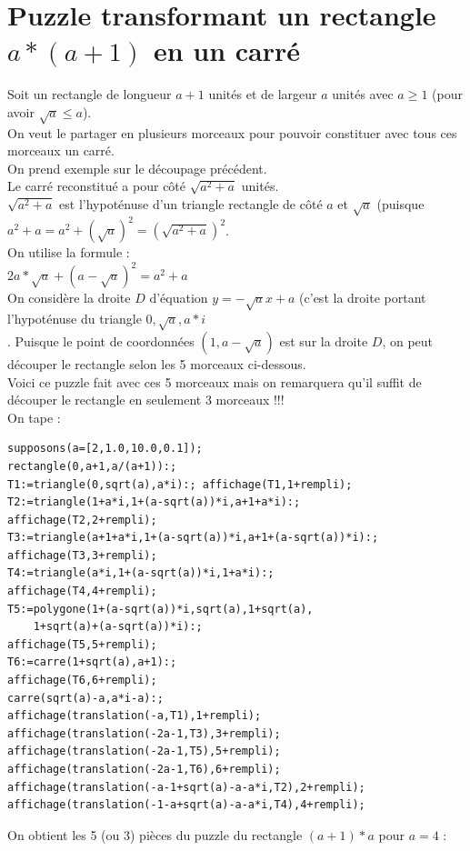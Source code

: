 \documentclass[a4paper,11pt]{book}
\begin{document}
\section{Puzzle transformant un rectangle $a*(a+1)$ en un carr\'e}
Soit un rectangle de longueur $a+1$ unit\'es et de largeur $a$ unit\'es avec 
$a\geq 1$ (pour avoir $\sqrt a \leq a$).\\
On veut le partager en plusieurs morceaux pour pouvoir constituer avec 
tous ces morceaux un carr\'e.\\
On prend exemple sur le d\'ecoupage pr\'ec\'edent.\\
Le carr\'e reconstitu\'e a pour c\^ot\'e $\sqrt{a^2+a}$ unit\'es.\\
$\sqrt{a^2+a}$ est l'hypot\'enuse d'un triangle rectangle de c\^ot\'e $a$ et 
$\sqrt a$ (puisque $a^2+a=a^2+(\sqrt a)^2=(\sqrt {a^2+a})^2$.\\
On utilise la formule :\\
$2a*\sqrt a+(a-\sqrt a)^2=a^2+a$\\
On consid\`ere la droite $D$ d'\'equation $y=-\sqrt a x+a$ (c'est la droite
portant l'hypot\'enuse du triangle $0,\sqrt a,a*i$\\.
Puisque le point de coordonn\'ees $(1,a-\sqrt a)$ est sur la droite $D$, on 
peut d\'ecouper le rectangle selon les 5 morceaux ci-dessous.\\
Voici ce puzzle fait avec ces 5 morceaux mais on remarquera qu'il suffit de 
d\'ecouper le rectangle en seulement 3 morceaux !!!\\
On tape :
\begin{verbatim}
supposons(a=[2,1.0,10.0,0.1]);
rectangle(0,a+1,a/(a+1)):;
T1:=triangle(0,sqrt(a),a*i):; affichage(T1,1+rempli);
T2:=triangle(1+a*i,1+(a-sqrt(a))*i,a+1+a*i):; 
affichage(T2,2+rempli);
T3:=triangle(a+1+a*i,1+(a-sqrt(a))*i,a+1+(a-sqrt(a))*i):; 
affichage(T3,3+rempli);
T4:=triangle(a*i,1+(a-sqrt(a))*i,1+a*i):; 
affichage(T4,4+rempli);
T5:=polygone(1+(a-sqrt(a))*i,sqrt(a),1+sqrt(a),
    1+sqrt(a)+(a-sqrt(a))*i):; 
affichage(T5,5+rempli);
T6:=carre(1+sqrt(a),a+1):;
affichage(T6,6+rempli);
carre(sqrt(a)-a,a*i-a):;
affichage(translation(-a,T1),1+rempli);
affichage(translation(-2a-1,T3),3+rempli);
affichage(translation(-2a-1,T5),5+rempli);
affichage(translation(-2a-1,T6),6+rempli);
affichage(translation(-a-1+sqrt(a)-a-a*i,T2),2+rempli);
affichage(translation(-1-a+sqrt(a)-a-a*i,T4),4+rempli);
\end{verbatim}
On obtient les 5 (ou 3) pi\`eces du puzzle du rectangle $(a+1)*a$ pour $a=4$ :\\
\end{document}

